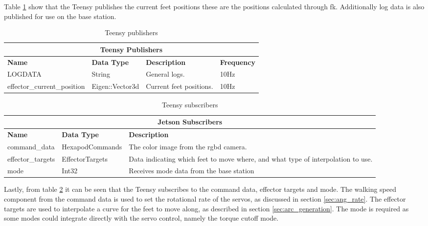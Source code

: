     Table \ref{tab:teensy_pubs} show that the Teensy publishes the current feet positions these are the positions calculated through \ac{fk}. Additionally
    log data is also published for use on the base station.
    \begin{table}[h]
        \begin{tabularx}{\textwidth}{| l | l | X | l |}
            \hline
            \multicolumn{4}{|c|}{\textbf{Teensy Publishers}} \\ \hline
            \textbf{Name} & \textbf{Data Type} & \textbf{Description} & \textbf{Frequency} \\ \hline
            LOGDATA & String & General logs. & 10Hz \\ \hline
            effector\_current\_position & Eigen::Vector3d & Current feet positions. & 10Hz \\ \hline
        \end{tabularx}
        \caption{Teensy publishers}
        \label{tab:teensy_pubs}
    \end{table}
    \begin{table}[h]
        \centering
        \begin{tabularx}{\textwidth}{| l | l | X |}
            \hline
            \multicolumn{3}{|c|}{\textbf{Jetson Subscribers}} \\ \hline
            \textbf{Name} & \textbf{Data Type} & \textbf{Description} \\ \hline
            command\_data & HexapodCommands & The color image from the \ac{rgbd} camera. \\ \hline
            effector\_targets & EffectorTargets & Data indicating which feet to move where, and what type of interpolation to use.\\ \hline
            mode & Int32 & Receives mode data from the base station \\ \hline
        \end{tabularx}
        \caption{Teensy subscribers}
        \label{tab:teensy_subs}
    \end{table}

    \noindent
    Lastly, from table \ref{tab:teensy_subs} it can be seen that the Teensy subscribes to the command data, effector targets and mode.
    The walking speed component from the command data is used to set the rotational rate of the servos, as discussed in section \ref{sec:ang_rate}.
    The effector targets are used to interpolate a curve for the feet to move along, as described in section \ref{sec:arc_generation}. The mode is required
    as some modes could integrate directly with the servo control, namely the torque cutoff mode.

